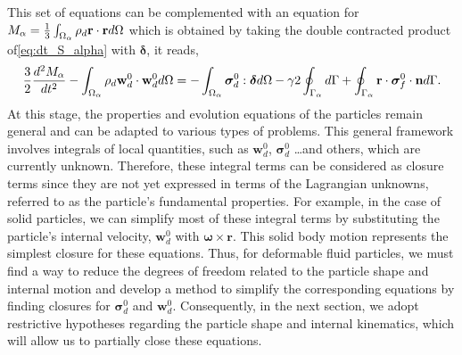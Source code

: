 This set of equations can be complemented with an equation for $M_\alpha = \frac{1}{3}\int_{\Omega_{\alpha}} \rho_d \textbf{r}\cdot \textbf{r} d\Omega$ which is obtained by taking the double contracted product of\ref{eq:dt_S_alpha} with $\bm\delta$,
it reads, 
\begin{equation}
    \frac{3}{2}\frac{d^2 M_\alpha}{dt^2}
    - \int_{\Omega_{\alpha}}  \rho_d \textbf{w}_d^0 \cdot \textbf{w}_d^0 d\Omega
    = 
    - \int_{\Omega_{\alpha}} \bm\sigma_d^0:\bm\delta d\Omega 
    - \gamma 2 \oint_{\Gamma_{\alpha}}  d\Gamma
    + \oint_{\Gamma_{\alpha}} \textbf{r}\cdot\bm\sigma_f^0\cdot \textbf{n} d\Gamma.
    \label{eq:dt_D_alpha}
\end{equation}
At this stage, the properties and evolution equations of the particles remain general and can be adapted to various types of problems. 
This general framework involves integrals of local quantities, such as $\textbf{w}_d^0$, $\bm\sigma_d^0$ \ldots and others, which are currently unknown. 
Therefore, these integral terms can be considered as closure terms since they are not yet expressed in terms of the Lagrangian unknowns, referred to as the particle's fundamental properties.
For example, in the case of solid particles, we can simplify most of these integral terms by substituting the particle's internal velocity, $\textbf{w}_d^0$ with $ \bm\omega \times \textbf{r}$. 
This solid body motion represents the simplest closure for these equations.  
Thus, for deformable fluid particles, we must find a way to reduce the degrees of freedom related to the particle shape and internal motion and develop a method to simplify the corresponding equations by finding closures for $\bm\sigma_d^0$ and $\textbf{w}_d^0$.
Consequently, in the next section, we adopt restrictive hypotheses regarding the particle shape and internal kinematics, which will allow us to partially close these equations.